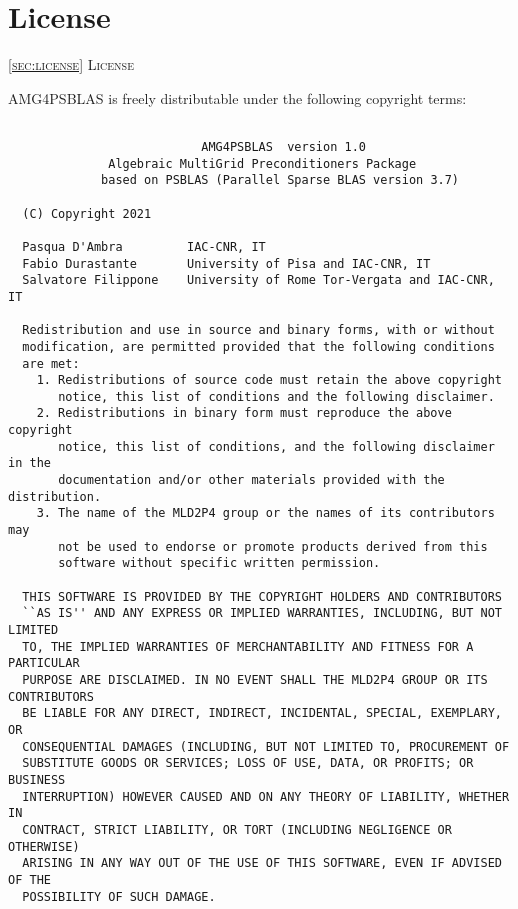 \section{License\label{sec:license}}
         {\textsc{\ref{sec:license} License}}


 AMG4PSBLAS is freely distributable under the following copyright
terms: {\small
\begin{verbatim}

                           AMG4PSBLAS  version 1.0
              Algebraic MultiGrid Preconditioners Package
             based on PSBLAS (Parallel Sparse BLAS version 3.7)

  (C) Copyright 2021

  Pasqua D'Ambra         IAC-CNR, IT
  Fabio Durastante       University of Pisa and IAC-CNR, IT
  Salvatore Filippone    University of Rome Tor-Vergata and IAC-CNR, IT

  Redistribution and use in source and binary forms, with or without
  modification, are permitted provided that the following conditions
  are met:
    1. Redistributions of source code must retain the above copyright
       notice, this list of conditions and the following disclaimer.
    2. Redistributions in binary form must reproduce the above copyright
       notice, this list of conditions, and the following disclaimer in the
       documentation and/or other materials provided with the distribution.
    3. The name of the MLD2P4 group or the names of its contributors may
       not be used to endorse or promote products derived from this
       software without specific written permission.

  THIS SOFTWARE IS PROVIDED BY THE COPYRIGHT HOLDERS AND CONTRIBUTORS
  ``AS IS'' AND ANY EXPRESS OR IMPLIED WARRANTIES, INCLUDING, BUT NOT LIMITED
  TO, THE IMPLIED WARRANTIES OF MERCHANTABILITY AND FITNESS FOR A PARTICULAR
  PURPOSE ARE DISCLAIMED. IN NO EVENT SHALL THE MLD2P4 GROUP OR ITS CONTRIBUTORS
  BE LIABLE FOR ANY DIRECT, INDIRECT, INCIDENTAL, SPECIAL, EXEMPLARY, OR
  CONSEQUENTIAL DAMAGES (INCLUDING, BUT NOT LIMITED TO, PROCUREMENT OF
  SUBSTITUTE GOODS OR SERVICES; LOSS OF USE, DATA, OR PROFITS; OR BUSINESS
  INTERRUPTION) HOWEVER CAUSED AND ON ANY THEORY OF LIABILITY, WHETHER IN
  CONTRACT, STRICT LIABILITY, OR TORT (INCLUDING NEGLIGENCE OR OTHERWISE)
  ARISING IN ANY WAY OUT OF THE USE OF THIS SOFTWARE, EVEN IF ADVISED OF THE
  POSSIBILITY OF SUCH DAMAGE.

\end{verbatim}
}
